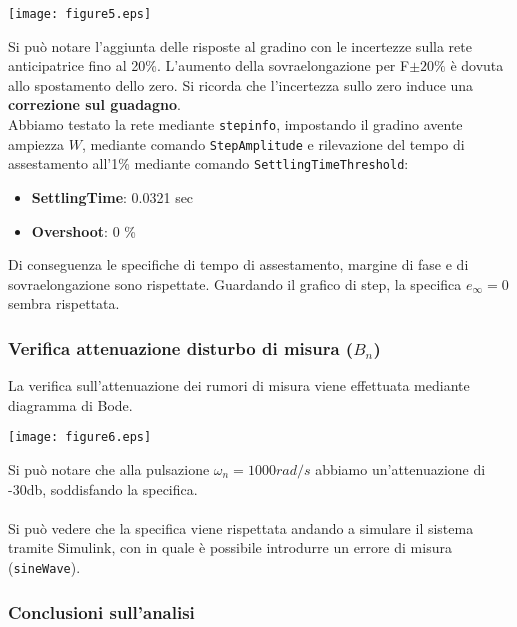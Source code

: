 \documentclass{article}
\begin{document}
\begin{center}
    \texttt{[image: figure5.eps]}
\end{center}

Si può notare l'aggiunta delle risposte al gradino con le incertezze sulla rete anticipatrice fino al 20\%. L'aumento della sovraelongazione per F$\pm20\%$ è dovuta allo spostamento dello zero. Si ricorda che l'incertezza sullo zero induce una \textbf{correzione sul guadagno}.\\

Abbiamo testato la rete mediante \texttt{stepinfo}, impostando il gradino avente ampiezza $W$, mediante comando \texttt{StepAmplitude} e rilevazione del tempo di assestamento all'1\% mediante comando \texttt{SettlingTimeThreshold}:

\begin{itemize}
    \item \textbf{SettlingTime}: 0.0321 sec
    \item \textbf{Overshoot}: 0 \%
\end{itemize}

Di conseguenza le specifiche di tempo di assestamento, margine di fase e di sovraelongazione sono rispettate. Guardando il grafico di step, la specifica $e_\infty=0$ sembra rispettata. 

\subsubsection{Verifica attenuazione disturbo di misura ($B_n$)}

La verifica sull'attenuazione dei rumori di misura viene effettuata mediante diagramma di Bode.

\begin{center}
    \texttt{[image: figure6.eps]}
\end{center}

Si può notare che alla pulsazione $\omega_n=1000 rad/s$ abbiamo un'attenuazione di -30db, soddisfando la specifica.\\\\

Si può vedere che la specifica viene rispettata andando a simulare il sistema tramite Simulink, con in quale è possibile introdurre un errore di misura (\texttt{sineWave}).

\subsubsection{Conclusioni sull'analisi}
\end{document}
